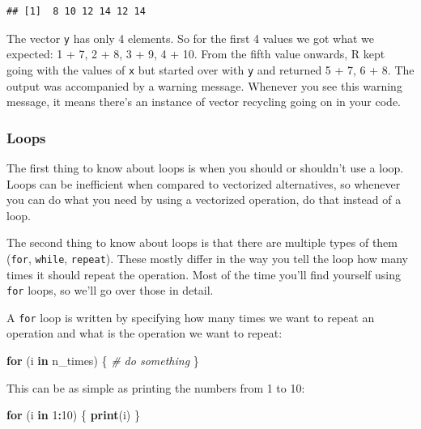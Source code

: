 \documentclass[
]{book}
\newenvironment{Shaded}{\begin{snugshade}}{\end{snugshade}}
\newcommand{\CommentTok}[1]{\textcolor[rgb]{0.56,0.35,0.01}{\textit{#1}}}
\newcommand{\ControlFlowTok}[1]{\textcolor[rgb]{0.13,0.29,0.53}{\textbf{#1}}}
\newcommand{\DecValTok}[1]{\textcolor[rgb]{0.00,0.00,0.81}{#1}}
\newcommand{\FunctionTok}[1]{\textcolor[rgb]{0.13,0.29,0.53}{\textbf{#1}}}
\newcommand{\NormalTok}[1]{#1}
\newcommand{\SpecialCharTok}[1]{\textcolor[rgb]{0.81,0.36,0.00}{\textbf{#1}}}
\begin{document}
\begin{verbatim}
## [1]  8 10 12 14 12 14
\end{verbatim}

The vector \texttt{y} has only 4 elements. So for the first 4 values we got what we
expected: 1 + 7, 2 + 8, 3 + 9, 4 + 10. From the fifth value onwards, R kept
going with the values of \texttt{x} but started over with \texttt{y} and returned 5 + 7,
6 + 8. The output was accompanied by a warning message. Whenever you see this
warning message, it means there's an instance of vector recycling going on in
your code.

\hypertarget{loops}{%
\subsubsection{Loops}\label{loops}}

The first thing to know about loops is when you should or shouldn't use a loop.
Loops can be inefficient when compared to vectorized alternatives, so whenever
you can do what you need by using a vectorized operation, do that instead of a
loop.

The second thing to know about loops is that there are multiple types of them
(\texttt{for}, \texttt{while}, \texttt{repeat}). These mostly differ in the way you tell the loop how
many times it should repeat the operation. Most of the time you'll find yourself
using \texttt{for} loops, so we'll go over those in detail.

A \texttt{for} loop is written by specifying how many times we want to repeat an
operation and what is the operation we want to repeat:

\begin{Shaded}
\begin{Highlighting}[]
\ControlFlowTok{for}\NormalTok{ (i }\ControlFlowTok{in}\NormalTok{ n\_times) \{}
  \CommentTok{\# do something}
\NormalTok{  \}}
\end{Highlighting}
\end{Shaded}

This can be as simple as printing the numbers from 1 to 10:

\begin{Shaded}
\begin{Highlighting}[]
\ControlFlowTok{for}\NormalTok{ (i }\ControlFlowTok{in} \DecValTok{1}\SpecialCharTok{:}\DecValTok{10}\NormalTok{) \{}
  \FunctionTok{print}\NormalTok{(i)}
\NormalTok{\}}
\end{Highlighting}
\end{Shaded}
\end{document}
